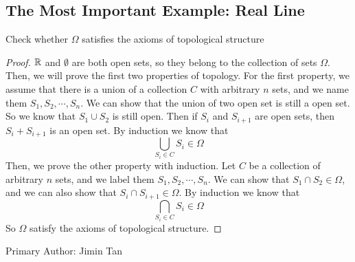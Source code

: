 \subsection{The Most Important Example: Real Line}

\begin{majorEx} %
  Check whether $\Omega$  satisfies the axioms of topological structure
\end{majorEx}

\begin{proof}
$\mathbb{R}$ and $\emptyset$ are both open sets, so they belong to the collection of sets $\Omega$. Then, we will prove the first two properties of topology. For the first property, we assume that there is a union of a collection $C$ with arbitrary $n$ sets, and we name them  $S_1, S_2, \cdots, S_n$. We can show that the union of two open set is still a open set. So we know that $S_1 \cup S_2$ is still open. Then if $S_i$ and $S_{i+1}$ are open sets, then $S_i + S_{i+1}$ is an open set. By induction we know that $$\bigcup_{S_i \in C} S_i \in \Omega$$
Then, we prove the other property with induction. Let $C$ be a collection of arbitrary $n$ sets, and we label them $S_1, S_2, \cdots, S_n$. We can show that $S_1 \cap S_2 \in \Omega$, and we can also show that $S_i \cap S_{i+1} \in \Omega$. By induction we know that $$\bigcap_{S_i \in C} S_i \in \Omega$$
So $\Omega$ satisfy the axioms of topological structure.
\end{proof}

Primary Author: Jimin Tan
